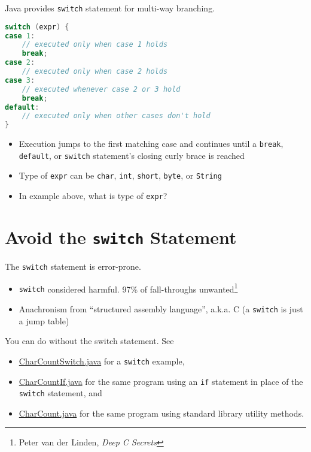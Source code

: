 \documentclass{article}
\begin{document}
Java provides {\tt switch} statement for multi-way branching.

\begin{lstlisting}[language=Java]
switch (expr) {
case 1:
    // executed only when case 1 holds
    break;
case 2:
    // executed only when case 2 holds
case 3:
    // executed whenever case 2 or 3 hold
    break;
default:
    // executed only when other cases don't hold
}
\end{lstlisting}

\begin{itemize}
\item Execution jumps to the first matching case and continues until a {\tt break}, {\tt default}, or {\tt switch} statement's closing curly brace is reached
\item Type of {\tt expr} can be {\tt char}, {\tt int}, {\tt short}, {\tt byte}, or {\tt String}
\item In example above, what is type of {\tt expr}?
\end{itemize}


\section{Avoid the {\tt switch} Statement}

The {\tt switch} statement is error-prone.
\begin{itemize}
\item {\tt switch} considered harmful.  97\% of fall-throughs
  unwanted\footnote{Peter van der Linden, {\it Deep C Secrets}}
\item Anachronism from ``structured assembly language'', a.k.a. C (a {\tt switch} is just a jump table)
\end{itemize}

You can do without the switch statement.  See

\begin{itemize}
\item \href{\code/basics/CharCountSwitch.java}{CharCountSwitch.java} for a {\tt switch} example,
\item \href{\code/basics/CharCountIf.java}{CharCountIf.java} for the same program using an {\tt if} statement in place of the {\tt switch} statement, and
\item  \href{\code/basics/CharCount.java}{CharCount.java} for the same program using standard library utility methods.
\end{itemize}
\end{document}
